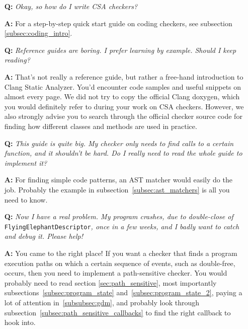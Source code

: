 \documentclass[a4paper,12pt]{article}
\begin{document}
\begin{itemize}
\item[\textbf{Q:}] \emph{Okay, so how do I write CSA checkers?}
\item[\textbf{A:}] For a step-by-step quick start guide on coding checkers, see subsection \ref{subsec:coding_intro}.
\end{itemize}
\medskip

\begin{itemize}
\item[\textbf{Q:}] \emph{Reference guides are boring. I prefer learning by example. Should I keep reading?}
\item[\textbf{A:}] That's not really a reference guide, but rather a free-hand introduction to Clang Static Analyzer. You'd encounter code samples and useful snippets on almost every page. We did not try to copy the official Clang doxygen, which you would definitely refer to during your work on CSA checkers. However, we also strongly advise you to search through the official checker source code for finding how different classes and methods are used in practice.
\end{itemize}
\medskip

\begin{itemize}
\item[\textbf{Q:}] \emph{This guide is quite big. My checker only needs to find calls to a certain function, and it shouldn't be hard. Do I really need to read the whole guide to implement it?}
\item[\textbf{A:}] For finding simple code patterns, an AST matcher would easily do the job. Probably the example in subsection~\ref{subsec:ast_matchers} is all you need to know.
\end{itemize}
\medskip

\begin{itemize}
\item[\textbf{Q:}] \emph{Now I have a real problem. My program crashes, due to double-close of} \lstinline|FlyingElephantDescriptor|\emph{, once in a few weeks, and I badly want to catch and debug it. Please help!}
\item[\textbf{A:}] You came to the right place! If you want a checker that finds a program execution paths on which a certain sequence of events, such as double-free, occurs, then you need to implement a path-sensitive checker. You would probably need to read section \ref{sec:path_sensitive}, most importantly subsections~\ref{subsec:program_state} and~\ref{subsec:program_state_2}, paying a lot of attention in~\ref{subsubsec:gdm}, and probably look through subsection~\ref{subsec:path_sensitive_callbacks} to find the right callback to hook into.
\end{itemize}
\medskip
\end{document}
